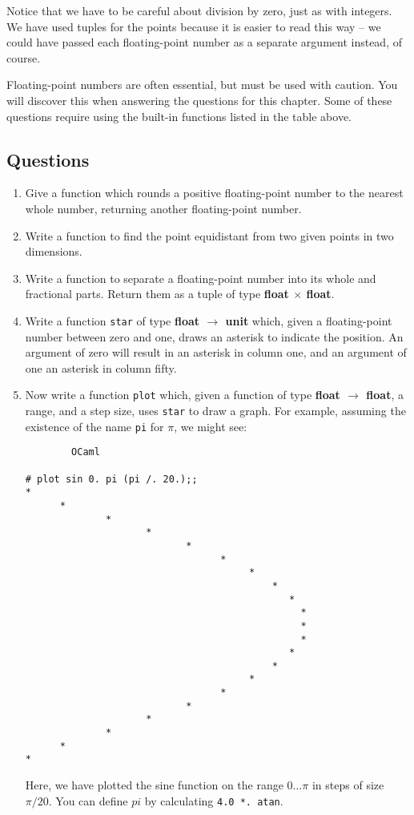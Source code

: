 \documentclass[]{book}
\begin{document}
\noindent Notice that we have to be careful about division by zero, just as with integers. We have used tuples for the points because it is easier to read this way -- we could have passed each floating-point number as a separate argument instead, of course.

Floating-point numbers are often essential, but must be used with caution. You will discover this when answering the questions for this chapter. Some of these questions require using the built-in functions listed in the table above.

\clearpage
\subsection*{Questions}
\begin{enumerate}
\item Give a function which rounds a positive floating-point number to the nearest whole number, returning another floating-point number.

\item Write a function to find the point equidistant from two given points in two dimensions.

\item Write a function to separate a floating-point number into its whole and fractional parts. Return them as a tuple of type \textsf{\textbf{float $\times$ float}}.

\item Write a function \texttt{star} of type \textsf{\textbf{float $\rightarrow$ unit}} which, given a floating-point number between zero and one, draws an asterisk to indicate the position. An argument of zero will result in an asterisk in column one, and an argument of one an asterisk in column fifty.

\item Now write a function \texttt{plot} which, given a function of type \textsf{\textbf{float $\rightarrow$ float}}, a range, and a step size, uses \texttt{star} to draw a graph. For example, assuming the existence of the name \texttt{pi} for $\pi$, we might see:

\begin{verbatim}
        OCaml

# plot sin 0. pi (pi /. 20.);;
*
      *
              *
                     *
                            *
                                  *
                                       *
                                           *
                                              *
                                                *
                                                *
                                                *
                                              *
                                           *
                                       *
                                  *
                            *
                     *
              *
      *
*
\end{verbatim}


\noindent Here, we have plotted the sine function on the range $0\ldots\pi$ in steps of size $\pi / 20$. You can define $pi$ by calculating \texttt{4.0\! *.\ \!atan}.
\end{enumerate}
\end{document}
